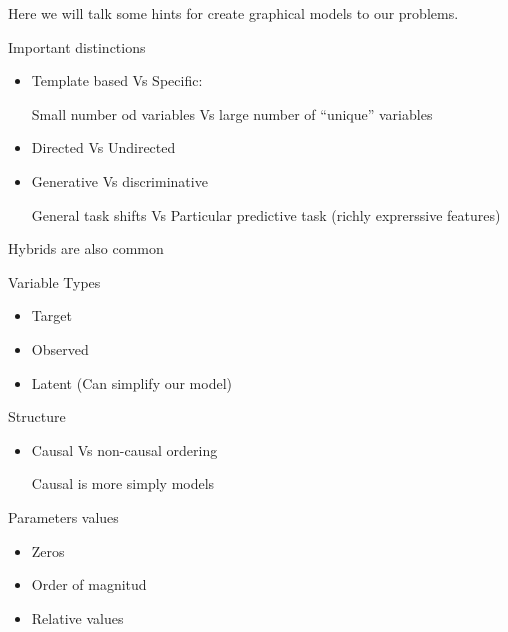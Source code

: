 
Here we will talk some hints for create graphical models to our problems.

\vspace{0.3cm}

Important distinctions

\begin{itemize}
 \item Template based Vs Specific:
 
 Small number od variables Vs large number of ``unique'' variables
 
 \item Directed Vs Undirected
 
 \item Generative Vs discriminative
 
 General task shifts Vs Particular predictive task (richly exprerssive features)
\end{itemize}

\begin{framed}
 \centering
Hybrids are also common
 \end{framed}

 \vspace{0.3cm}

Variable Types

\begin{itemize}
 \item Target
 \item Observed
 \item Latent (Can simplify our model)
\end{itemize}

\vspace{0.3cm}

Structure
\begin{itemize}
 \item Causal Vs non-causal ordering
 
 Causal is more simply models
\end{itemize}

 \vspace{0.3cm}
 
 Parameters values

\begin{itemize}
 \item Zeros
 \item Order of magnitud
 \item Relative values
\end{itemize}





